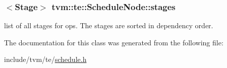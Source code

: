 \subsubsection[{\texorpdfstring{stages}{stages}}]{$<${\bf Stage}$>$ tvm\+::te\+::\+Schedule\+Node\+::stages}\hypertarget{classtvm_1_1te_1_1ScheduleNode_ab5649969db603d6b7b4d155c0d09cdd5}{}\label{classtvm_1_1te_1_1ScheduleNode_ab5649969db603d6b7b4d155c0d09cdd5}


list of all stages for ops. The stages are sorted in dependency order. 



The documentation for this class was generated from the following file\+:\begin{DoxyCompactItemize}
\item 
include/tvm/te/\hyperlink{schedule_8h}{schedule.\+h}\end{DoxyCompactItemize}
